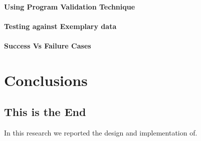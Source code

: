 \documentclass[12pt,a4paper,oneside]{book}
\begin{document}
		
		
		
		\subsubsection{Using Program Validation Technique}
	
		\subsubsection{Testing against Exemplary data}
	
		\subsubsection{Success Vs Failure Cases}






\chapter{Conclusions}
\label{ch:Conclusions}

\section{This is the End}
\label{sec:This_is_the_end}
%
In this research we reported the design and implementation of.


\end{document}
